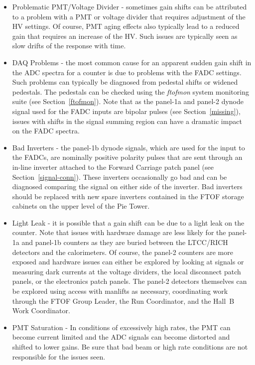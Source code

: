 \documentclass[12pt]{article}
\begin{document}
\begin{itemize}
\item Problematic PMT/Voltage Divider - sometimes gain shifts can be attributed to a
problem with a PMT or voltage divider that requires adjustment of the HV settings. Of
course, PMT aging effects also typically lead to a reduced gain that requires an increase
of the HV. Such issues are typically seen as slow drifts of the response with time.
\item DAQ Problems - the most common cause for an apparent sudden gain shift in the
ADC spectra for a counter is due to problems with the FADC settings. Such problems
can typically be diagnosed from pedestal shifts or widened pedestals. The pedestals can
be checked using the {\it ftofmon} system monitoring suite (see Section~\ref{ftofmon}).
Note that as the panel-1a and panel-2 dynode signal used for the FADC inputs are bipolar
pulses (see Section~\ref{missing}), issues with shifts in the signal summing region can have
a dramatic impact on the FADC spectra. 
\item Bad Inverters - the panel-1b dynode signals, which are used for the input to the 
FADCs, are nominally positive polarity pulses that are sent through an in-line inverter 
attached to the Forward Carriage patch panel (see Section~\ref{signal-conn}). These 
inverters occasionally go bad and can be diagnosed comparing the signal on either side 
of the inverter. Bad inverters should be replaced with new spare inverters contained in 
the FTOF storage cabinets on the upper level of the Pie Tower.
\item Light Leak - it is possible that a gain shift can be due to a light leak on the 
counter. Note that issues with hardware damage are less likely for the panel-1a and 
panel-1b counters as they are buried between the LTCC/RICH detectors and the 
calorimeters. Of course, the panel-2 counters are more exposed and hardware issues can 
either be explored by looking at signals or measuring dark currents at the voltage 
dividers, the local disconnect patch panels, or the electronics patch panels. The 
panel-2 detectors themselves can be explored using access with manlifts as necessary, 
coordinating work through the FTOF Group Leader, the Run Coordinator, and the Hall~B
Work Coordinator.
\item PMT Saturation - In conditions of excessively high rates, the PMT can become
current limited and the ADC signals can become distorted and shifted to lower gains. Be
sure that bad beam or high rate conditions are not responsible for the issues seen.
\end{itemize}
\end{document}
